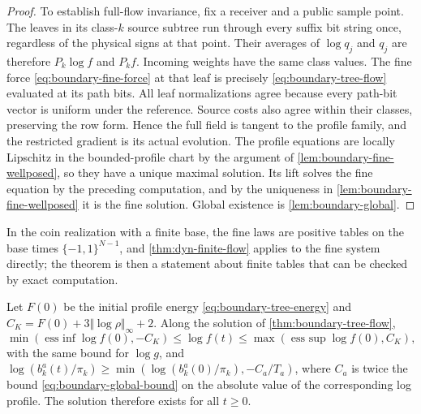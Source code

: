 \begin{proof}
To establish full-flow invariance, fix a receiver and a public sample point. The leaves in its class-$k$ source subtree run through every suffix bit string once, regardless of the physical signs at that point. Their averages of $\log q_j$ and $q_j$ are therefore $P_k\log f$ and $P_kf$. Incoming weights have the same class values. The fine force \cref{eq:boundary-fine-force} at that leaf is precisely \cref{eq:boundary-tree-flow} evaluated at its path bits. All leaf normalizations agree because every path-bit vector is uniform under the reference. Source costs also agree within their classes, preserving the row form. Hence the full field is tangent to the profile family, and the restricted gradient is its actual evolution. The profile equations are locally Lipschitz in the bounded-profile chart by the argument of \cref{lem:boundary-fine-wellposed}, so they have a unique maximal solution. Its lift solves the fine equation by the preceding computation, and by the uniqueness in \cref{lem:boundary-fine-wellposed} it is the fine solution. Global existence is \cref{lem:boundary-global}.
\end{proof}

In the coin realization with a finite base, the fine laws are positive tables on the base times $\{-1,1\}^{N-1}$, and \cref{thm:dyn-finite-flow} applies to the fine system directly; the theorem is then a statement about finite tables that can be checked by exact computation.

Let $F(0)$ be the initial profile energy \cref{eq:boundary-tree-energy} and $C_K=F(0)+3\Vert\log\rho\Vert_\infty+2$. Along the solution of \cref{thm:boundary-tree-flow},
\begin{equation}
 \min\left(\operatorname*{ess\ inf}\log f(0),-C_K\right)
 \le\log f(t)\le
 \max\left(\operatorname*{ess\ sup}\log f(0),C_K\right),
 \label{eq:boundary-global-bound}
\end{equation}
with the same bound for $\log g$, and $\log(b_k^a(t)/\pi_k)\ge\min(\log(b_k^a(0)/\pi_k),-C_a/T_a)$, where $C_a$ is twice the bound \cref{eq:boundary-global-bound} on the absolute value of the corresponding log profile. The solution therefore exists for all $t\ge0$.

